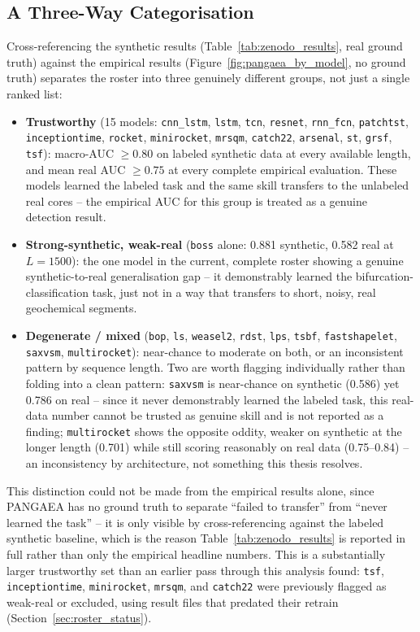 \subsection{A Three-Way Categorisation}
\label{sec:three_way}
Cross-referencing the synthetic results (Table~\ref{tab:zenodo_results}, real ground truth) against the empirical results (Figure~\ref{fig:pangaea_by_model}, no ground truth) separates the roster into three genuinely different groups, not just a single ranked list:

\begin{itemize}
    \item \textbf{Trustworthy} (15 models: \texttt{cnn\_lstm}, \texttt{lstm}, \texttt{tcn}, \texttt{resnet}, \texttt{rnn\_fcn}, \texttt{patchtst}, \texttt{inceptiontime}, \texttt{rocket}, \texttt{minirocket}, \texttt{mrsqm}, \texttt{catch22}, \texttt{arsenal}, \texttt{st}, \texttt{grsf}, \texttt{tsf}): macro-AUC $\geq 0.80$ on labeled synthetic data at every available length, and mean real AUC $\geq 0.75$ at every complete empirical evaluation. These models learned the labeled task and the same skill transfers to the unlabeled real cores -- the empirical AUC for this group is treated as a genuine detection result.
    \item \textbf{Strong-synthetic, weak-real} (\texttt{boss} alone: 0.881 synthetic, 0.582 real at $L{=}1500$): the one model in the current, complete roster showing a genuine synthetic-to-real generalisation gap -- it demonstrably learned the bifurcation-classification task, just not in a way that transfers to short, noisy, real geochemical segments.
    \item \textbf{Degenerate / mixed} (\texttt{bop}, \texttt{ls}, \texttt{weasel2}, \texttt{rdst}, \texttt{lps}, \texttt{tsbf}, \texttt{fastshapelet}, \texttt{saxvsm}, \texttt{multirocket}): near-chance to moderate on both, or an inconsistent pattern by sequence length. Two are worth flagging individually rather than folding into a clean pattern: \texttt{saxvsm} is near-chance on synthetic (0.586) yet 0.786 on real -- since it never demonstrably learned the labeled task, this real-data number cannot be trusted as genuine skill and is not reported as a finding; \texttt{multirocket} shows the opposite oddity, weaker on synthetic at the longer length (0.701) while still scoring reasonably on real data (0.75--0.84) -- an inconsistency by architecture, not something this thesis resolves.
\end{itemize}

This distinction could not be made from the empirical results alone, since PANGAEA has no ground truth to separate ``failed to transfer'' from ``never learned the task'' -- it is only visible by cross-referencing against the labeled synthetic baseline, which is the reason Table~\ref{tab:zenodo_results} is reported in full rather than only the empirical headline numbers. This is a substantially larger trustworthy set than an earlier pass through this analysis found: \texttt{tsf}, \texttt{inceptiontime}, \texttt{minirocket}, \texttt{mrsqm}, and \texttt{catch22} were previously flagged as weak-real or excluded, using result files that predated their retrain (Section~\ref{sec:roster_status}).

